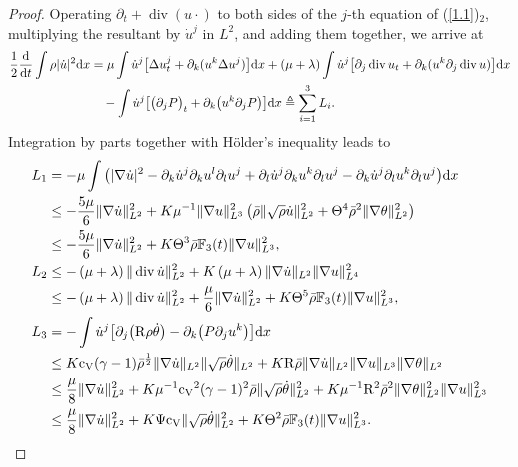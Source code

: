 \documentclass[11pt]{article}
\DeclareMathOperator{\divv}{div}
\newcommand{\na}{\nabla}
\begin{document}
\begin{proof}
Operating $\partial_t+ \divv(u\cdot)$ to both sides of the $j$-th equation of (\ref{1.1})$_2$, multiplying the resultant by $\dot u^j$ in $L^2$, and adding them together, we arrive at
\begin{align}
\frac{1}{2} \frac{{\rm d}}{{\rm d} t} \int \rho |\dot u|^2 {\rm d} x
& = \mu \int \dot u^j \big[\Delta u^j_t + \partial_k (u^k \Delta u^j) \big] {\rm d} x + (\mu+\lambda) \int \dot u^j \big[\partial_j \divv u_{t} + \partial_k(u^k \partial_j \divv u) \big] {\rm d} x \notag\\
& \quad - \int \dot u^j \big[ \big( \partial_j P \big)_t + \partial_k \big(u^k \partial_j P \big) \big] {\rm d} x \triangleq \sum_{i=1}^3 L_i.\label{5.22}
\end{align}
Integration by parts together with H{\"o}lder's inequality leads to
\begin{align*}
L_1
& = - \mu \int \big(|\nabla \dot u|^2 - \partial_k \dot u^j \partial_k u^l \partial_l u^j + \partial_l \dot u^j \partial_k u^k \partial_l u^j - \partial_k \dot u^j \partial_l u^k \partial_{l} u^j \big) {\rm d} x\\
& \leq - \frac{5\mu}{6} \|\nabla \dot u\|_{L^2}^2 + K \mu^{-1} \|\na u\|_{L^3}^2 \left(\bar{\rho} \|\sqrt{\rho} \dot{u}\|_{L^2}^2 + \Theta^4 \bar{\rho}^2 \|\na \theta\|_{L^2}^2 \right)\\
& \leq - \frac{5\mu}{6} \|\nabla \dot u\|_{L^2}^2 + K \Theta^3 \bar{\rho} \mathbb{F}_3 (t) \|\na u\|_{L^3}^2,\\
L_2
& \leq - \left(\mu + \lambda \right) \|\divv \dot{u}\|_{L^2}^2 + K \left(\mu + \lambda \right) \|\na \dot{u}\|_{L^2} \|\na u\|_{L^4}^2\\
& \leq - \left(\mu + \lambda \right) \|\divv \dot{u}\|_{L^2}^2 + \frac{\mu}{6} \|\nabla \dot u\|_{L^2}^2 + K \Theta^5 \bar{\rho} \mathbb{F}_3 (t) \|\na u\|_{L^3}^2, \\
L_3
& = - \int \dot u^j \big[ \partial_j \big({\rm R} \rho \dot \theta \big) - \partial_k \big(P \partial_j u^k \big) \big] {\rm d} x\\
&\leq K {\rm c_V}(\gamma - 1) \bar{\rho}^{\frac{1}{2}} \|\nabla \dot u\|_{L^2} \|\sqrt\rho \dot \theta\|_{L^2} + K {\rm R} \bar{\rho} \|\nabla\dot u\|_{L^2} \|\nabla u\|_{L^3} \|\nabla\theta\|_{L^2} \\
&\leq \frac{\mu}{8} \|\nabla\dot u\|_{L^2}^2 + K \mu^{-1} {\rm c_V}^2(\gamma - 1)^2 \bar{\rho} \| \sqrt\rho \dot \theta\|_{L^2}^2 + K \mu^{-1} {\rm R}^2 \bar{\rho}^2 \|\nabla \theta\|_{L^2}^2 \|\na u\|_{L^3}^2\\
&\leq \frac{\mu}{8} \|\nabla\dot u\|_{L^2}^2 + K \Psi {\rm c_V} \| \sqrt\rho \dot \theta\|_{L^2}^2 + K \Theta^2 \bar{\rho} \mathbb{F}_3 (t) \|\na u\|_{L^3}^2.

\end{align*}
\end{proof}
\end{document}

